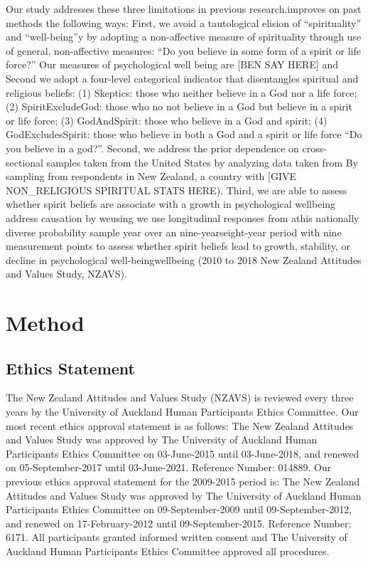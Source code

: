 \documentclass[
  english,
  man]{apa6}
\begin{document}
Our study addresses these three limitations in previous research.improves on past methods the following ways: First, we avoid a tautological elision of \enquote{spirituality} and \enquote{well-being}y by adopting a non-affective measure of spirituality through use of general, non-affective measures: \enquote{Do you believe in some form of a spirit or life force?} Our measures of psychological well being are {[}BEN SAY HERE{]} and Second we adopt a four-level categorical indicator that disentangles spiritual and religious beliefs: (1) Skeptics: those who neither believe in a God nor a life force; (2) SpiritExcludeGod: those who no not believe in a God but believe in a spirit or life force; (3) GodAndSpirit: those who believe in a God and spirit; (4) GodExcludesSpirit: those who believe in both a God and a spirit or life force \enquote{Do you believe in a god?}. Second, we address the prior dependence on cross-sectional samples taken from the United States by analyzing data taken from By sampling from respondents in New Zealand, a country with {[}GIVE NON\_RELIGIOUS SPIRITUAL STATS HERE). Third, we are able to assess whether spirit beliefs are associate with a growth in psychological wellbeing address causation by weusing we use longitudinal responses from athis nationally diverse probability sample year over an nine-yearseight-year period with nine measurement points to assess whether spirit beliefs lead to growth, stability, or decline in psychological well-beingwellbeing (2010 to 2018 New Zealand Attitudes and Values Study, NZAVS).

\hypertarget{method}{%
\section{Method}\label{method}}

\hypertarget{ethics-statement}{%
\subsection{Ethics Statement}\label{ethics-statement}}

The New Zealand Attitudes and Values Study (NZAVS) is reviewed every three years by the University of Auckland Human Participants Ethics Committee. Our most recent ethics approval statement is as follows: The New Zealand Attitudes and Values Study was approved by The University of Auckland Human Participants Ethics Committee on 03-June-2015 until 03-June-2018, and renewed on 05-September-2017 until 03-June-2021. Reference Number: 014889. Our previous ethics approval statement for the 2009-2015 period is: The New Zealand Attitudes and Values Study was approved by The University of Auckland Human Participants Ethics Committee on 09-September-2009 until 09-September-2012, and renewed on 17-February-2012 until 09-September-2015. Reference Number: 6171. All participants granted informed written consent and The University of Auckland Human Participants Ethics Committee approved all procedures.
\end{document}
